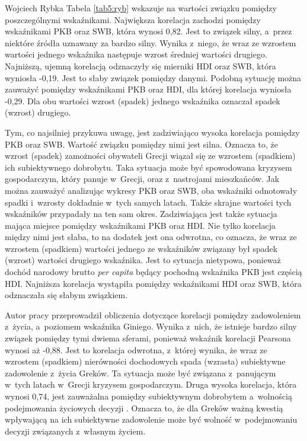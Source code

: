 \begin{artplenv}{Wojciech Rybka}
Tabela \ref{tab5:ryb} wskazuje na wartości związku pomiędzy poszczególnymi wskaźnikami. Największa korelacja zachodzi pomiędzy
wskaźnikami PKB oraz SWB, która wynosi 0,82. Jest to związek silny, a~przez niektóre źródła uznawany za bardzo silny.
Wynika z~niego, że wraz ze wzrostem wartości jednego wskaźnika następuje wzrost średniej wartości drugiego. Najniższą,
ujemną korelacją odznaczyły się mierniki HDI oraz SWB, która wyniosła -0,19. Jest to słaby związek pomiędzy danymi.
Podobną sytuację można zauważyć pomiędzy wskaźnikami PKB oraz HDI, dla której korelacja wyniosła -0,29. Dla obu
wartości wzrost (spadek) jednego wskaźnika oznaczał spadek (wzrost) drugiego. 

Tym, co najsilniej przykuwa uwagę, jest zadziwiająco wysoka korelacja pomiędzy PKB oraz SWB. Wartość
związku pomiędzy nimi jest silna. Oznacza to, że wzrost (spadek) zamożności obywateli
Grecji wiązał się ze wzrostem (spadkiem) ich subiektywnego dobrobytu. Taka sytuacja może być spowodowana kryzysem
gospodarczym, który panuje w~Grecji, oraz z~nastrojami mieszkańców. Jak można zauważyć analizując wykresy PKB oraz SWB,
oba wskaźniki odnotowały spadki i~wzrosty dokładnie w~tych samych latach. Także skrajne wartości tych wskaźników
przypadały na ten sam okres. Zadziwiająca jest także sytuacja mająca miejsce pomiędzy wskaźnikami PKB oraz HDI. Nie
tylko korelacja między nimi jest słaba, to na dodatek jest ona odwrotna, co oznacza, że wraz ze wzrostem (spadkiem)
wartości jednego ze wskaźników związany był spadek (wzrost) wartości drugiego wskaźnika. Jest to sytuacja nietypowa,
ponieważ dochód narodowy brutto \textit{per capita} będący pochodną wskaźnika PKB jest częścią HDI. Najniższa korelacja
wystąpiła pomiędzy wskaźnikami HDI oraz SWB, która odznaczała się słabym związkiem. 

Autor pracy przeprowadził obliczenia dotyczące korelacji pomiędzy zadowoleniem z~życia, a~poziomem wskaźnika Giniego.
Wynika z~nich, że istnieje bardzo silny związek pomiędzy tymi dwiema sferami, ponieważ wskaźnik korelacji Pearsona
wynosi aż -0,88. Jest to korelacja odwrotna, z~której wynika, że wraz ze wzrostem (spadkiem) nierówności dochodowych
spada (wzrasta) subiektywne zadowolenie z~życia Greków. Ta sytuacja może być związana z~panującym w~tych
latach w~Grecji kryzysem gospodarczym. Druga wysoka korelacja, która wynosi 0,74, jest zauważalna pomiędzy subiektywnym
dobrobytem a~wolnością podejmowania życiowych decyzji
\parencite{noauthor_world_2018}.
Oznacza
to, że dla Greków ważną kwestią wpływającą na ich subiektywne zadowolenie może być wolność w~podejmowaniu decyzji
związanych z~własnym życiem.


\end{artplenv}

